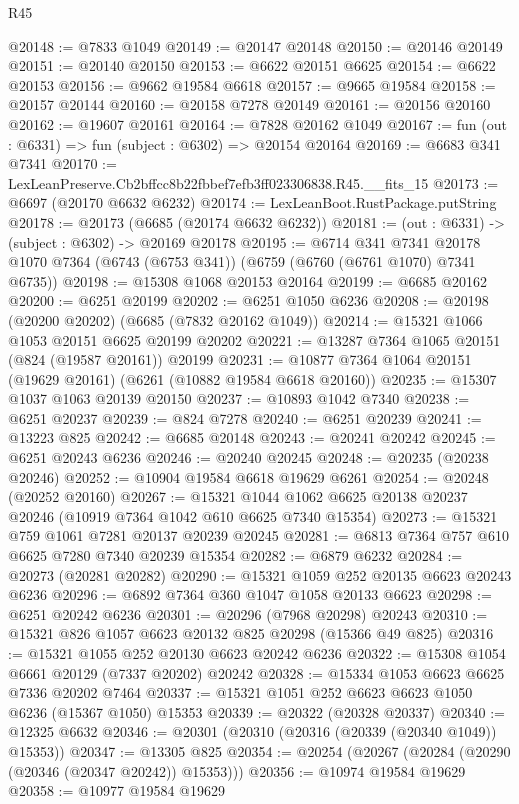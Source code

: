 \begin{lexlean}{R45}
\begin{coremodule}
{@20148 := @7833 @1049
@20149 := @20147 @20148
@20150 := @20146 @20149
@20151 := @20140 @20150
@20153 := @6622 @20151 @6625
@20154 := @6622 @20153
@20156 := @9662 @19584 @6618
@20157 := @9665 @19584
@20158 := @20157 @20144
@20160 := @20158 @7278 @20149
@20161 := @20156 @20160
@20162 := @19607 @20161
@20164 := @7828 @20162 @1049
@20167 := fun (out : @6331) => fun (subject : @6302) => @20154 @20164
@20169 := @6683 @341 @7341
@20170 := LexLeanPreserve.Cb2bffcc8b22fbbef7efb3ff023306838.R45.__fits_15
@20173 := @6697 (@20170 @6632 @6232)
@20174 := LexLeanBoot.RustPackage.putString
@20178 := @20173 (@6685 (@20174 @6632 @6232))
@20181 := (out : @6331) -> (subject : @6302) -> @20169 @20178
@20195 := @6714
    @341
    @7341
    @20178
    @1070
    @7364
    (@6743 (@6753 @341))
    (@6759 (@6760 (@6761 @1070) @7341 @6735))
@20198 := @15308 @1068 @20153 @20164
@20199 := @6685 @20162
@20200 := @6251 @20199
@20202 := @6251 @1050 @6236
@20208 := @20198 (@20200 @20202) (@6685 (@7832 @20162 @1049))
@20214 := @15321 @1066 @1053 @20151 @6625 @20199 @20202
@20221 := @13287 @7364 @1065 @20151 (@824 (@19587 @20161)) @20199
@20231 := @10877 @7364 @1064 @20151 (@19629 @20161) (@6261 (@10882 @19584 @6618 @20160))
@20235 := @15307 @1037 @1063 @20139 @20150
@20237 := @10893 @1042 @7340
@20238 := @6251 @20237
@20239 := @824 @7278
@20240 := @6251 @20239
@20241 := @13223 @825
@20242 := @6685 @20148
@20243 := @20241 @20242
@20245 := @6251 @20243 @6236
@20246 := @20240 @20245
@20248 := @20235 (@20238 @20246)
@20252 := @10904 @19584 @6618 @19629 @6261
@20254 := @20248 (@20252 @20160)
@20267 := @15321 @1044 @1062 @6625 @20138 @20237 @20246 (@10919 @7364 @1042 @610 @6625 @7340 @15354)
@20273 := @15321 @759 @1061 @7281 @20137 @20239 @20245
@20281 := @6813 @7364 @757 @610 @6625 @7280 @7340 @20239 @15354
@20282 := @6879 @6232
@20284 := @20273 (@20281 @20282)
@20290 := @15321 @1059 @252 @20135 @6623 @20243 @6236
@20296 := @6892 @7364 @360 @1047 @1058 @20133 @6623
@20298 := @6251 @20242 @6236
@20301 := @20296 (@7968 @20298) @20243
@20310 := @15321 @826 @1057 @6623 @20132 @825 @20298 (@15366 @49 @825)
@20316 := @15321 @1055 @252 @20130 @6623 @20242 @6236
@20322 := @15308 @1054 @6661 @20129 (@7337 @20202) @20242
@20328 := @15334 @1053 @6623 @6625 @7336 @20202 @7464
@20337 := @15321 @1051 @252 @6623 @6623 @1050 @6236 (@15367 @1050) @15353
@20339 := @20322 (@20328 @20337)
@20340 := @12325 @6632
@20346 := @20301 (@20310 (@20316 (@20339 (@20340 @1049)) @15353))
@20347 := @13305 @825
@20354 := @20254 (@20267 (@20284 (@20290 (@20346 (@20347 @20242)) @15353)))
@20356 := @10974 @19584 @19629
@20358 := @10977 @19584 @19629
}
\end{coremodule}
\end{lexlean}
